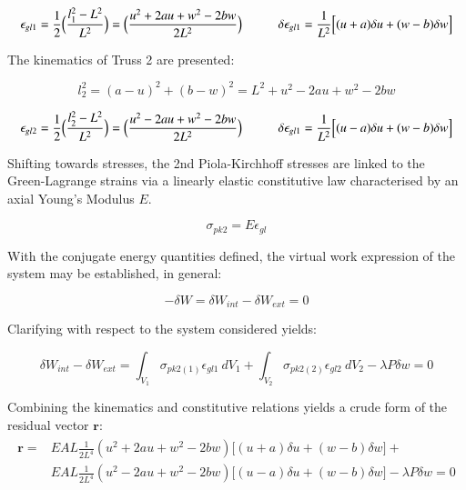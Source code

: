 \begin{equation} 
\epsilon_{gl1} = \frac{1}{2}
\Big(\frac{l_1^2-L^2}{L^2}\Big)
=
\Big(\frac{u^2 + 2au +w^2 -2bw}{2L^2}\Big)
\hspace{10mm}
\delta\epsilon_{gl1} = 
\frac{1}{L^2}
\Big[
(u+a)\delta u
+
(w-b)\delta w
\Big]
\label{eqapp0_2}
\end{equation}

The kinematics of Truss 2 are presented:

\begin{equation} 
l_2^2 = (a-u)^2 + (b-w)^2 = L^2 + u^2 - 2au +w^2 -2bw
\label{eqapp0_2_1}
\end{equation}

\begin{equation} 
\epsilon_{gl2} = \frac{1}{2}
\Big(\frac{l_2^2-L^2}{L^2}\Big)
=
\Big(\frac{u^2 - 2au +w^2 -2bw}{2L^2}\Big)
\hspace{10mm}
\delta\epsilon_{gl1} = 
\frac{1}{L^2}
\Big[
(u-a)\delta u
+
(w-b)\delta w
\Big]
\label{eqapp0_2_2}
\end{equation}

Shifting towards stresses, the 2nd Piola-Kirchhoff stresses are linked to the Green-Lagrange strains via a linearly elastic constitutive law characterised by an axial Young's Modulus $E$.

\begin{equation} 
\sigma_{pk2} = E \epsilon_{gl}
\label{eqapp0_3}
\end{equation}

With the conjugate energy quantities defined, the virtual work expression of the system may be established, in general:

\begin{equation} 
-\delta W = \delta W_{int} - \delta W_{ext} = 0
\label{eqapp0_4}
\end{equation}

Clarifying with respect to the system considered yields:

\begin{equation} 
\delta W_{int} - \delta W_{ext} = 
\int_{V_1} \sigma_{pk2(1)} \epsilon_{gl1}
\ dV_1
+
\int_{V_2} \sigma_{pk2(2)} \epsilon_{gl2}
\ dV_2
- \lambda P \delta w = 0
\label{eqapp0_5}
\end{equation}

Combining the kinematics and constitutive relations yields a crude form of the residual vector $\mathbf{r}$:
\begin{gather} 
	\begin{aligned}
		\mathbf{r} = 
		&EAL
		\frac{1}{2L^4}
		(u^2 + 2au +w^2 -2bw)
		\Big[
		(u+a)\delta u
		+
		(w-b)\delta w
		\Big] +
		\\
		&EAL
		\frac{1}{2L^4}
		(u^2 - 2au +w^2 -2bw)
		\Big[
		(u-a)\delta u
		+
		(w-b)\delta w
		\Big] 
		- \lambda P \delta w = 0
		\label{eqapp0_6_0}
	\end{aligned}
\end{gather}

